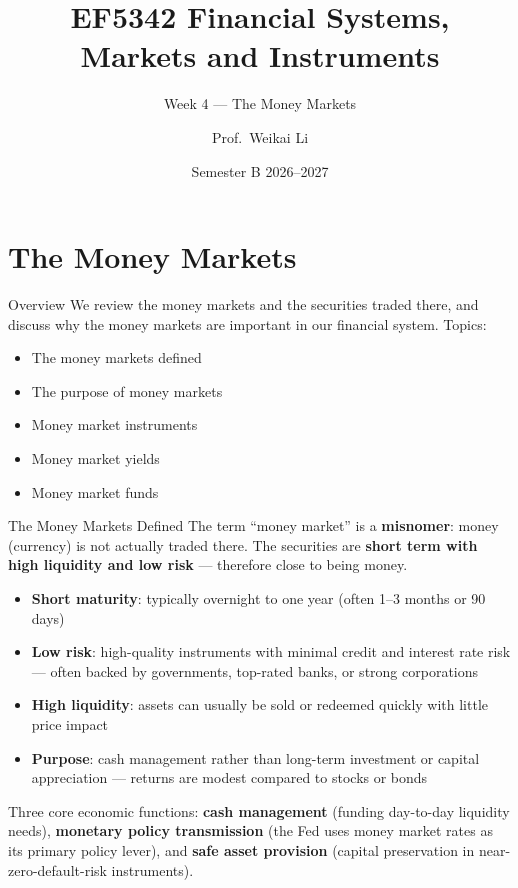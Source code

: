 \documentclass[aspectratio=169]{beamer}
\title{EF5342 Financial Systems, Markets and Instruments}
\subtitle{Week 4 --- The Money Markets}
\author{Prof.\ Weikai Li}
\institute{City University of Hong Kong}
\date{Semester B 2026--2027}
\begin{document}

\begin{frame}
\titlepage
\end{frame}

\section{The Money Markets}

\begin{frame}{Overview}
We review the money markets and the securities traded there, and discuss why the money markets are important in our financial system. Topics:
\begin{itemize}
  \item The money markets defined
  \item The purpose of money markets
  \item Money market instruments
  \item Money market yields
  \item Money market funds
\end{itemize}
\end{frame}

\begin{frame}{The Money Markets Defined}
The term ``money market'' is a \textbf{misnomer}: money (currency) is not actually traded there. The securities are \textbf{short term with high liquidity and low risk} --- therefore close to being money.
\begin{itemize}
  \item \textbf{Short maturity}: typically overnight to one year (often 1--3 months or 90 days)
  \item \textbf{Low risk}: high-quality instruments with minimal credit and interest rate risk --- often backed by governments, top-rated banks, or strong corporations
  \item \textbf{High liquidity}: assets can usually be sold or redeemed quickly with little price impact
  \item \textbf{Purpose}: cash management rather than long-term investment or capital appreciation --- returns are modest compared to stocks or bonds
\end{itemize}
\vspace{0.3em}
Three core economic functions: \textbf{cash management} (funding day-to-day liquidity needs), \textbf{monetary policy transmission} (the Fed uses money market rates as its primary policy lever), and \textbf{safe asset provision} (capital preservation in near-zero-default-risk instruments).
\end{frame}
\end{document}

